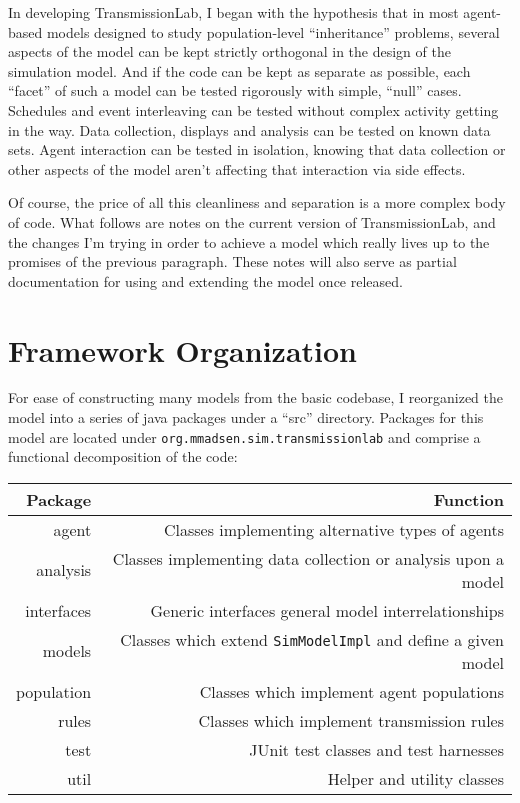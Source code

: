 \documentclass{kluwer-mem-copyright}
\begin{document}
\begin{article}
In developing TransmissionLab, I began with the hypothesis that 
in most agent-based models designed to study
population-level ``inheritance'' problems, several aspects of the model can be
kept strictly orthogonal in the design of the simulation model.  And if the code
can be kept as separate as possible, each ``facet'' of such a model can be
tested rigorously with simple, ``null'' cases.  Schedules and event interleaving
can be tested without complex activity getting in the way.  Data collection,
displays and analysis can be tested on known data sets.  Agent interaction can
be tested in isolation, knowing that data collection or other aspects of the
model aren't affecting that interaction via side effects.  

Of course, the price of all this cleanliness and separation is a more complex
body of code.  What follows are notes on the current version of TransmissionLab, and the changes I'm trying in order to achieve a model which
really lives up to the promises of the previous paragraph.  These notes will
also serve as partial documentation for using and extending the model once
released.  

\section{Framework Organization}
For ease of constructing many models from the basic codebase, I reorganized the
model into a series of java packages under a ``src'' directory.  Packages for
this model are located under \texttt{org.mmadsen.sim.transmissionlab} and comprise
a functional decomposition of the code:\\
\begin{tabular}{|r|r|}
\hline
Package&Function\\
\hline
agent&Classes implementing alternative types of agents\\
analysis&Classes implementing data collection or analysis upon a model\\
interfaces&Generic interfaces general model interrelationships\\
models&Classes which extend \texttt{SimModelImpl} and define a given model\\
population&Classes which implement agent populations\\ 
rules&Classes which implement transmission rules\\
test&JUnit test classes and test harnesses \\
util&Helper and utility classes\\
\hline
\end{tabular}



\end{article}
\end{document}
